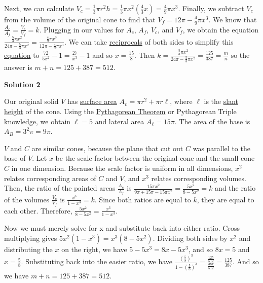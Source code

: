 \begin{enumerate}
 Next, we can calculate $V_c=\frac{1}{3}\pi r^2h=\frac{1}{3}\pi x^2 \left(\frac{4}{3}x\right)=\frac{4}{9}\pi x^3$.  Finally, we subtract $V_c$ from the volume of the original cone to find that $V_f=12\pi - \frac{4}{9}\pi x^3$. We know that $\frac{A_c}{A_f}=\frac{V_c}{V_f}=k.$ Plugging in our values for $A_c$, $A_f$, $V_c$, and $V_f$, we obtain the equation $\frac{\frac{5}{3}\pi x^2}{24\pi - \frac{5}{3}\pi x^2}=\frac{\frac{4}{9}\pi x^3}{12\pi - \frac{4}{9}\pi x^3}$.  We can take \href{https://artofproblemsolving.com/wiki/index.php?title=Reciprocal}{reciprocals} of both sides to simplify this \href{https://artofproblemsolving.com/wiki/index.php?title=Equation}{equation} to $\frac{72}{5x^2} - 1 = \frac{27}{x^3} - 1$ and so $x = \frac{15}{8}$.  Then $k = \frac{\frac{5}{3}\pi x^2}{24\pi - \frac{5}{3}\pi x^2}= \frac{125}{387} = \frac mn$ so the answer is $m+n=125+387=\boxed{512}$.

 



\textbf{Solution 2}

Our original solid $V$ has \href{https://artofproblemsolving.com/wiki/index.php?title=Surface\_area}{surface area} $A_v = \pi r^2 + \pi r \ell$, where $\ell$ is the \href{https://artofproblemsolving.com/wiki/index.php?title=Slant\_height}{slant height} of the cone. Using the \href{https://artofproblemsolving.com/wiki/index.php?title=Pythagorean\_Theorem}{Pythagorean Theorem} or Pythagorean Triple knowledge, we obtain $\ell = 5$ and lateral area $A_\ell = 15\pi$. The area of the base is $A_B = 3^2\pi = 9\pi$.

 $V$ and $C$ are similar cones, because the plane that cut out $C$ was parallel to the base of $V$. Let $x$ be the scale factor between the original cone and the small cone $C$ in one dimension. Because the scale factor is uniform in all dimensions, $x^2$ relates corresponding areas of $C$ and $V$, and $x^3$ relates corresponding volumes. Then, the ratio of the painted areas $\frac{A_c}{A_f}$ is $\frac{15\pi x^2}{9\pi + 15\pi - 15\pi x^2} = \frac{5 x^2}{8 - 5 x^2} = k$ and the ratio of the volumes $\frac{V_c}{V_f}$ is $\frac{x^3}{1 - x^3} = k$. Since both ratios are equal to $k$, they are equal to each other. Therefore, $\frac{5 x^2}{8 - 5 x^2} = \frac{x^3}{1 - x^3}$.

 Now we must merely solve for x and substitute back into either ratio. Cross multiplying gives $5 x^2(1 - x^3) = x^3(8 - 5 x^2)$. Dividing both sides by $x^2$ and distributing the $x$ on the right, we have $5 - 5 x^3 = 8 x - 5 x^3$, and so $8 x = 5$ and $x = \frac{5}{8}$. Substituting back into the easier ratio, we have $\frac{(\frac{5}{8})^3}{1 - (\frac{5}{8})^3} = \frac{\frac{125}{512}}{\frac{387}{512}} = \frac{125}{387}$. And so we have $m + n = 125 + 387 = \boxed{512}$.


\end{enumerate}
